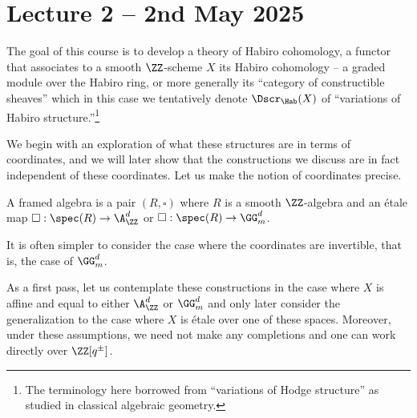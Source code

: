 \section{Lecture 2 -- 2nd May 2025}\label{sec: lecture 2}
The goal of this course is to develop a theory of Habiro cohomology, a functor that associates to a smooth $\ZZ$-scheme $X$ its Habiro cohomology -- a graded module over the Habiro ring, or more generally its ``category of constructible sheaves'' which in this case we tentatively denote $\Dscr_{\Hab}(X)$ of ``variations of Habiro structure.''\footnote{The terminology here borrowed from ``variations of Hodge structure'' as studied in classical algebraic geometry.}

We begin with an exploration of what these structures are in terms of coordinates, and we will later show that the constructions we discuss are in fact independent of these coordinates. Let us make the notion of coordinates precise. 
\begin{definition}\label{def: framed algebra}
    A framed algebra is a pair $(R,\square)$ where $R$ is a smooth $\ZZ$-algebra and an \'{e}tale map $\square:\spec(R)\to\A^{d}_{\ZZ}$ or $\square:\spec(R)\to\GG_{m}^{d}$. 
\end{definition}
\begin{remark}
    It is often simpler to consider the case where the coordinates are invertible, that is, the case of $\GG_{m}^{d}$. 
\end{remark}
As a first pass, let us contemplate these constructions in the case where $X$ is affine and equal to either $\A^{d}_{\ZZ}$ or $\GG_{m}^{d}$ and only later consider the generalization to the case where $X$ is \'{e}tale over one of these spaces. Moreover, under these assumptions, we need not make any completions and one can work directly over $\ZZ[q^{\pm}]$.

